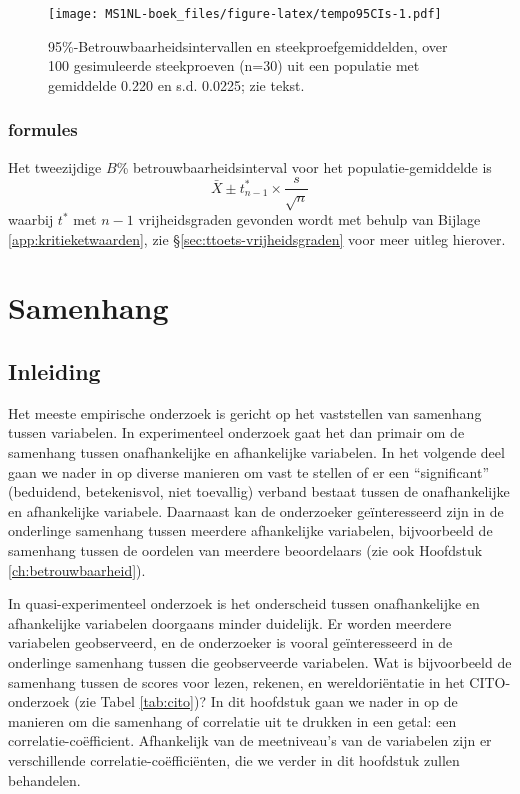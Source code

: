 \documentclass[
]{book}
\begin{document}
\begin{figure}
\centering
\texttt{[image: MS1NL-boek\_files/figure-latex/tempo95CIs-1.pdf]}
\caption{\label{fig:tempo95CIs}95\%-Betrouwbaarheidsintervallen en steekproefgemiddelden, over 100 gesimuleerde steekproeven (n=30) uit een populatie met gemiddelde 0.220 en s.d. 0.0225; zie tekst.}
\end{figure}

\hypertarget{formules-2}{%
\subsection{formules}\label{formules-2}}

Het tweezijdige \(B\)\% betrouwbaarheidsinterval voor het
populatie-gemiddelde is
\begin{equation}
  \bar{X} \pm t^*_{n-1} \times \frac{s}{\sqrt{n}}
  \label{eq:t-onesampleCI}
\end{equation}
waarbij \(t^*\) met \(n-1\) vrijheidsgraden gevonden wordt met behulp van
Bijlage \ref{app:kritieketwaarden}, zie
§\ref{sec:ttoets-vrijheidsgraden} voor meer uitleg hierover.

\hypertarget{ch:samenhang}{%
\chapter{Samenhang}\label{ch:samenhang}}

\hypertarget{inleiding-5}{%
\section{Inleiding}\label{inleiding-5}}

Het meeste empirische onderzoek is gericht op het vaststellen van
samenhang tussen variabelen. In experimenteel onderzoek gaat het dan
primair om de samenhang tussen onafhankelijke en afhankelijke
variabelen. In het volgende deel gaan we nader in op diverse manieren om
vast te stellen of er een ``significant'' (beduidend, betekenisvol, niet
toevallig) verband bestaat tussen de onafhankelijke en afhankelijke
variabele. Daarnaast kan de onderzoeker geïnteresseerd zijn in de
onderlinge samenhang tussen meerdere afhankelijke variabelen,
bijvoorbeeld de samenhang tussen de oordelen van meerdere beoordelaars
(zie ook Hoofdstuk \ref{ch:betrouwbaarheid}).

In quasi-experimenteel onderzoek is het onderscheid tussen
onafhankelijke en afhankelijke variabelen doorgaans minder duidelijk. Er
worden meerdere variabelen geobserveerd, en de onderzoeker is vooral
geïnteresseerd in de onderlinge samenhang tussen die geobserveerde
variabelen. Wat is bijvoorbeeld de samenhang tussen de scores voor
lezen, rekenen, en wereldoriëntatie in het CITO-onderzoek (zie
Tabel \ref{tab:cito})? In dit hoofdstuk gaan we nader in op de manieren
om die samenhang of correlatie uit te drukken in een getal: een
correlatie-coëfficient. Afhankelijk van de meetniveau's van de
variabelen zijn er verschillende correlatie-coëfficiënten, die we verder
in dit hoofdstuk zullen behandelen.
\end{document}
